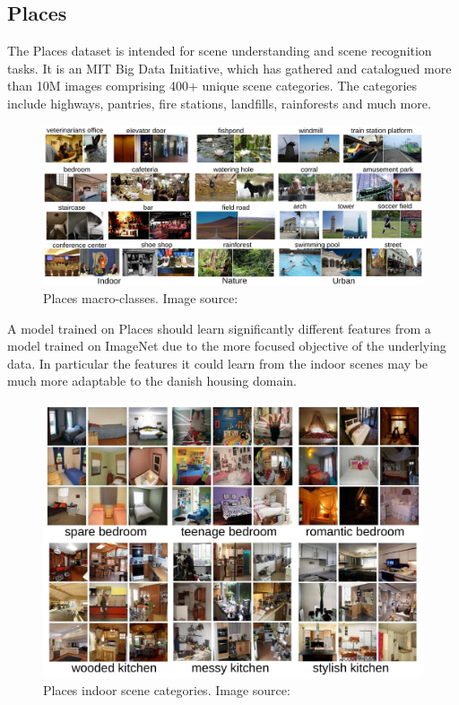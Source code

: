 \subsection{Places}\label{sec:places}
The Places\autocite{Places365} dataset is intended for scene understanding and scene recognition tasks. 
It is an MIT Big Data Initiative, which has gathered and catalogued more than 10M images comprising 400+ unique scene categories.
The categories include highways, pantries, fire stations, landfills, rainforests and much more.
\begin{figure}[H]
    \centering
    \includegraphics[scale=0.28]{pictures/random/placesart_1}
    \caption{Places macro-classes. Image source: \autocite{Places365}}
    \label{fig:placesdata1}
\end{figure}

A model trained on Places should learn significantly different features from a model trained on ImageNet due to the more focused objective of the underlying data.
In particular the features it could learn from the indoor scenes may be much more adaptable to the danish housing domain.
\begin{figure}[H]
    \centering
    \includegraphics[scale=0.4]{pictures/random/placesart_2}
    \caption{Places indoor scene categories. Image source: \autocite{Places365}}
    \label{fig:placesdata2}
\end{figure}